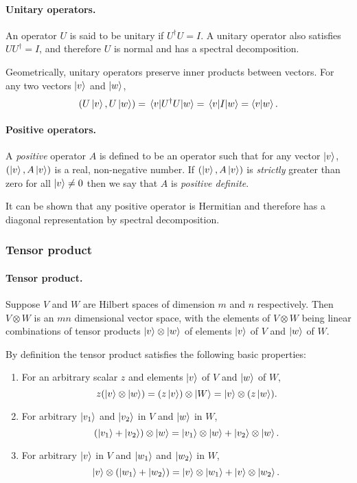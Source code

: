 \documentclass{article}
\numberwithin{theorem}{section}
\numberwithin{corollary}{section}
\numberwithin{postulate}{section}
\begin{document}
\paragraph{Unitary operators.} An operator $U$ is said to be unitary if
$U^{\dagger}U = I$. A unitary operator also satisfies $UU^{\dagger} = I$, and
therefore $U$ is normal and has a spectral decomposition.

Geometrically, unitary operators preserve inner products between vectors. For
any two vectors $\ket{v}$ and $\ket{w}$, \[
  (U\ket{v}, U\ket{w}) = \mel{v}{U^{\dagger}U}{w} = \mel{v}{I}{w} =
  \ip{v}{w}.
\]

\paragraph{Positive operators.} A \emph{positive} operator $A$ is defined to be
an operator such that for any vector $\ket{v}$, $(\ket{v}, A\ket{v})$ is a
real, non-negative number. If $(\ket{v}, A\ket{v})$ is \emph{strictly} greater
than zero for all $\ket{v} \neq 0$ then we say that $A$ is \emph{positive
definite}.

It can be shown that any positive operator is Hermitian and therefore has a
diagonal representation by spectral decomposition.

\subsubsection{Tensor product}

\paragraph{Tensor product.} Suppose $V$ and $W$ are Hilbert spaces of dimension
$m$ and $n$ respectively. Then $V \otimes W$ is an $mn$ dimensional vector
space, with the elements of $V \otimes W$ being linear combinations of tensor
products $\ket{v} \otimes \ket{w}$ of elements $\ket{v}$ of $V$ and $\ket{w}$
of $W$.

By definition the tensor product satisfies the following basic properties:
\begin{enumerate}
  \item For an arbitrary scalar $z$ and elements $\ket{v}$ of $V$ and $\ket{w}$
    of $W$, \[
      z(\ket{v} \otimes \ket{w}) = (z\ket{v}) \otimes \ket{W} = \ket{v} \otimes
      (z\ket{w}).
    \]
  \item For arbitrary $\ket{v_1}$ and $\ket{v_2}$ in $V$ and $\ket{w}$ in $W$,
    \[
      (\ket{v_1} + \ket{v_2}) \otimes \ket{w} = \ket{v_1} \otimes \ket{w} +
      \ket{v_2} \otimes \ket{w}.
    \]
  \item For arbitrary $\ket{v}$ in $V$ and $\ket{w_1}$ and $\ket{w_2}$ in $W$,
    \[
      \ket{v} \otimes (\ket{w_1} + \ket{w_2}) = \ket{v} \otimes \ket{w_1} +
      \ket{v} \otimes \ket{w_2}.
    \]
\end{enumerate}
\end{document}
